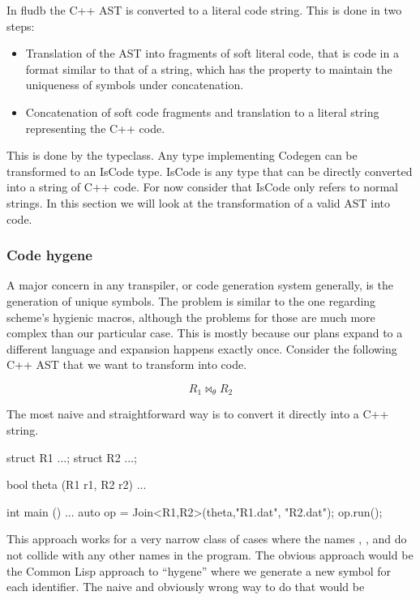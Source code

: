 In fludb the C++ AST is converted to a literal code string. This is
done in two steps:

\begin{itemize}
\item Translation of the AST into fragments of soft literal code, that
is code in a format similar to that of a string, which has the
property to maintain the uniqueness of symbols under concatenation.
\item Concatenation of soft code fragments and translation to a literal
string representing the C++ code.
\end{itemize}

This is done by the  typeclass. Any type implementing
Codegen can be transformed to an IsCode type. IsCode is any type that
can be directly converted into a string of C++ code. For now consider
that IsCode only refers to normal strings. In this section we will
look at the transformation of a valid AST into code.

\subsubsection{Code hygene}

A major concern in any transpiler, or code generation system generally,
is the generation of unique symbols. The problem is similar to the one
regarding scheme’s hygienic macros, although the problems for those
are much more complex than our particular case. This is mostly because
our plans expand to a different language and expansion happens exactly
once. Consider the following C++ AST that we want to transform into
code.

\[
  R_1 \Join_{\theta} R_2
\]

The most naive and straightforward way is to convert it directly into
a C++ string.

\begin{cppcode}
struct R1 {...};
struct R2 {...};

bool theta (R1 r1, R2 r2) {
  ...
}

int main () {
  ...
  auto op = Join<R1,R2>(theta,"R1.dat", "R2.dat");
  op.run();
}
\end{cppcode}


This approach works for a very narrow class of cases where the names
, , and  do not collide with any other
names in the program. The obvious approach would be the Common Lisp
approach to ``hygene'' where we generate a new symbol for each
identifier. The naive and obviously wrong way to do that would be

